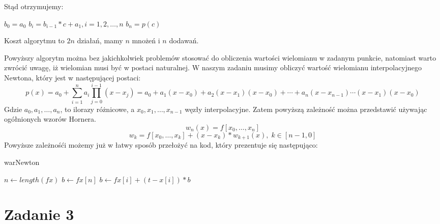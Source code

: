 \documentclass{article}
\begin{document}
\begin{center}
\begin{flushleft}
        Stąd otrzymujemy: \newline

        \(b_{0}=a_{0}\) \newline
        \( b_{i}=b_{i-1}*c+a_{1},i=1,2,\ldots,n\) \newline 
        \(b_{n}=p(c)\)
     \end{flushleft}
     Koszt algorytmu to \(2n\) działań, mamy \(n\) mnożeń i \(n\) dodawań. \newline 

     Powyższy algorytm można bez jakichkolwiek problemów stosować do obliczenia wartości wielomianu w zadanym punkcie, natomiast 
     warto zwrócić uwagę, iż wielomian musi być w postaci naturalnej. W naszym zadaniu musimy obliczyć wartość wielomianu interpolacyjnego Newtona, który jest w następującej postaci: \newline
     \[p(x) = a_{0} + \sum_{i=1}^{n} a_{i} \prod_{j=0}^{i-1} (x-x_{j}) = a_{0} + a_{1}(x-x_{0}) + a_{2}(x-x_{1})(x-x_{0})+\cdots+a_{n}(x-x_{n-1})\cdots(x-x_{1})(x-x_{0})\] \newline
     Gdzie \(a_{0},a_{1},\ldots,a_{n}\), to ilorazy różnicowe, a \(x_{0},x_{1},\ldots,x_{n-1}\) węzły interpolacyjne. \newline
     Zatem powyższą zależność można przedstawić używając ogółnionych wzorów Hornera. \newline 
     \[w_{n}(x)=f[x_{0},\dots,x_{n}]\]
     \[w_{k}=f[x_{0},\dots,x_{k}]+(x-x_{k})*w_{k+1}(x), \;k\in[n-1,0]\] 
     \newpage
     Powyższe zależnośći możemy już w łatwy sposób przełożyć na kod, który prezentuje się następująco:
     \begin{flushleft}
        \begin{algorithm}
            \caption{warNewton}\label{alg:warNewton}
            \begin{algorithmic}
                \State$n \gets length(fx)$
                \State$b \gets fx[n]$
                    \State$b \gets fx[i] + (t - x[i]) * b$
                \EndFor \newline
                \EndFunction
            \end{algorithmic}
        \end{algorithm}
    \end{flushleft}
    \section{Zadanie 3}

\end{center}
\end{document}
